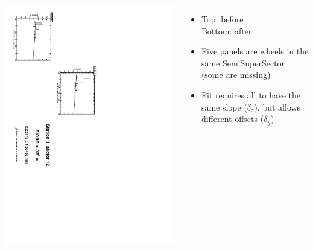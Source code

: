 \documentclass[compress]{beamer}
\begin{document}
\begin{frame}
\begin{columns}
\vfill
\includegraphics[height=\linewidth, angle=90]{zfits_after/zfit_1_12.pdf}
\begin{itemize}
\item Top: before \\ Bottom: after
\item Five panels are wheels in the same SemiSuperSector (some are missing)
\item Fit requires all to have the same slope ($\delta_z$), but allows different offsets ($\delta_y$)
\end{itemize}
\end{columns}
\end{frame}
\end{document}
